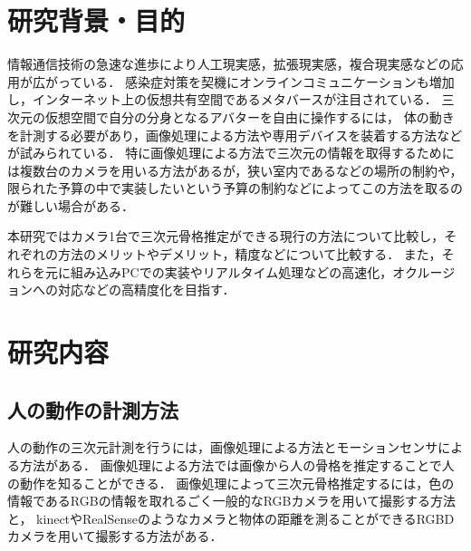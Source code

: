 \documentclass[titlepage]{jarticle}
\begin{document}
\maketitle

%
%
\section{研究背景・目的}
%
情報通信技術の急速な進歩により人工現実感，拡張現実感，複合現実感などの応用が広がっている．
感染症対策を契機にオンラインコミュニケーションも増加し，インターネット上の仮想共有空間であるメタバースが注目されている．
三次元の仮想空間で自分の分身となるアバターを自由に操作するには，
体の動きを計測する必要があり，画像処理による方法や専用デバイスを装着する方法などが試みられている．
特に画像処理による方法で三次元の情報を取得するためには複数台のカメラを用いる方法があるが，狭い室内であるなどの場所の制約や，
限られた予算の中で実装したいという予算の制約などによってこの方法を取るのが難しい場合がある．

本研究ではカメラ1台で三次元骨格推定ができる現行の方法について比較し，それぞれの方法のメリットやデメリット，精度などについて比較する．
また，それらを元に組み込みPCでの実装やリアルタイム処理などの高速化，オクルージョンへの対応などの高精度化を目指す．
%
%
\section{研究内容}

%
%
\subsection{人の動作の計測方法}
%
人の動作の三次元計測を行うには，画像処理による方法とモーションセンサによる方法がある．
画像処理による方法では画像から人の骨格を推定することで人の動作を知ることができる．
画像処理によって三次元骨格推定するには，色の情報であるRGBの情報を取れるごく一般的なRGBカメラを用いて撮影する方法と，
kinectやRealSenseのようなカメラと物体の距離を測ることができるRGBDカメラを用いて撮影する方法がある．
\end{document}
